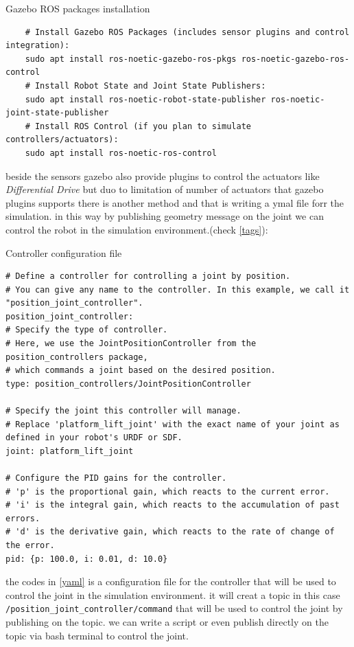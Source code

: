 \documentclass[../../main]{subfiles}
\begin{document}
\begin{codebox}[label=gazebo ROS packages installation]{Gazebo ROS packages installation}
  \begin{verbatim}
    # Install Gazebo ROS Packages (includes sensor plugins and control integration):
    sudo apt install ros-noetic-gazebo-ros-pkgs ros-noetic-gazebo-ros-control
    # Install Robot State and Joint State Publishers:
    sudo apt install ros-noetic-robot-state-publisher ros-noetic-joint-state-publisher
    # Install ROS Control (if you plan to simulate controllers/actuators):
    sudo apt install ros-noetic-ros-control
  \end{verbatim} 
\end{codebox}

beside the sensors gazebo also provide plugins to control the actuators like \emph{Differential Drive}
but duo to limitation of number of actuators that gazebo plugins supports there is another method and that is writing a ymal file forr the simulation.
in this way by publishing geometry message on the joint we can control the robot in the simulation environment.(check \cref{tags}):
\newpage
\begin{codebox}[label=yaml]{Controller configuration file}
  \begin{verbatim}
# Define a controller for controlling a joint by position.
# You can give any name to the controller. In this example, we call it "position_joint_controller".
position_joint_controller:
# Specify the type of controller.
# Here, we use the JointPositionController from the position_controllers package,
# which commands a joint based on the desired position.
type: position_controllers/JointPositionController

# Specify the joint this controller will manage.
# Replace 'platform_lift_joint' with the exact name of your joint as defined in your robot's URDF or SDF.
joint: platform_lift_joint

# Configure the PID gains for the controller.
# 'p' is the proportional gain, which reacts to the current error.
# 'i' is the integral gain, which reacts to the accumulation of past errors.
# 'd' is the derivative gain, which reacts to the rate of change of the error.
pid: {p: 100.0, i: 0.01, d: 10.0}
\end{verbatim}
\end{codebox}

  the codes in \cref{yaml} is a configuration file for the controller that will be used to control the joint in the simulation environment.
  it will creat a topic in this case\\ \texttt{/position\_joint\_controller/command} that will be used to control the joint by publishing on the topic.
  we can write a script or even publish directly on the topic via bash terminal to control the joint.
\end{document}
